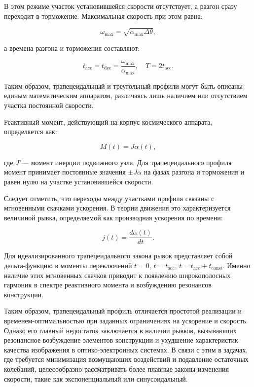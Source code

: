 В этом режиме участок установившейся скорости отсутствует, а разгон сразу переходит в торможение. Максимальная скорость при этом равна:

\begin{equation}
	\omega_{\mathrm{max}} = \sqrt{\alpha_{\max}  \Delta \theta},
\end{equation}

а времена разгона и торможения составляют:

\begin{equation}
	t_{\mathrm{acc}} = t_{\mathrm{dec}} = \frac{\omega_{\mathrm{max}}}{\alpha_{\max}}, \quad T = 2t_{\mathrm{acc}}.
\end{equation}




Таким образом, трапецеидальный и треугольный профили могут быть описаны единым математическим аппаратом, различаясь лишь наличием или отсутствием участка постоянной скорости.

Реактивный момент, действующий на корпус космического аппарата, определяется как:

\begin{equation}
	M(t) = J \alpha(t),
\end{equation}

где \(J\)"--- момент инерции подвижного узла.
Для трапецеидального профиля момент принимает постоянные значения $\pm J \alpha$ на фазах разгона и торможения и равен нулю на участке установившейся скорости. 

Следует отметить, что переходы между участками профиля связаны с мгновенными скачками ускорения. В теории движения это характеризуется величиной рывка, определяемой как производная ускорения по времени:

\begin{equation}
	j(t) = \frac{d\alpha(t)}{dt}.
\end{equation}

Для идеализированного трапецеидального закона рывок представляет собой дельта-функцию в моменты переключений $t=0$, $t=t_{\mathrm{acc}}$, $t=t_{\mathrm{acc}}+t_{\mathrm{const}}$.  Именно наличие этих мгновенных скачков приводит к появлению широкополосных гармоник в спектре реактивного момента и возбуждению резонансов конструкции.

Таким образом, трапецеидальный профиль отличается простотой реализации и временем-оптимальностью при заданных ограничениях на ускорение и скорость. Однако его главный недостаток заключается в наличии рывков, вызывающих резонансное возбуждение элементов конструкции и ухудшение характеристик качества изображения в оптико-электронных системах. В связи с этим в задачах, где требуется минимизация возмущающих воздействий и подавление остаточных колебаний, целесообразно рассматривать более плавные законы изменения скорости, такие как экспоненциальный или синусоидальный.


